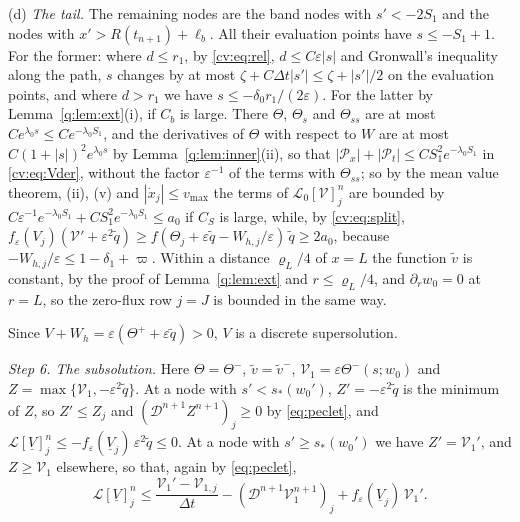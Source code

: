 \documentclass[11pt]{amsart}
\theoremstyle{definition}
\theoremstyle{remark}
\newcommand{\ve}{\varepsilon}
\newcommand{\Lop}{\mathcal{L}}
\begin{document}
\smallskip
(d) \emph{The tail.} The remaining nodes are the band nodes with $s'<-2S_1$ and the
nodes with $x'>R(t_{n+1})+\ell_b$. All their evaluation points have $s\le-S_1+1$. For the
former: where $d\le r_1$, by \eqref{cv:eq:rel}, $d\le C\ve|s|$ and Gronwall's inequality
along the path, $s$ changes by at most
$\zeta+C\Delta t|s'|\le\zeta+|s'|/2$ on the evaluation points, and where $d>r_1$ we have
$s\le-\delta_0r_1/(2\ve)$. For the latter by Lemma~\ref{q:lem:ext}(i), if $C_b$ is large. There
$\Theta$, $\Theta_s$ and $\Theta_{ss}$ are at most $Ce^{\lambda_0s}\le Ce^{-\lambda_0S_1}$, and the derivatives of $\Theta$ with
respect to $W$ are at most $C(1+|s|)^2e^{\lambda_0s}$ by Lemma~\ref{q:lem:inner}(ii), so that
$|\mathcal P_x|+|\mathcal P_t|\le CS_1^2e^{-\lambda_0S_1}$ in \eqref{cv:eq:Vder}, without the factor $\ve^{-1}$ of
the terms with $\Theta_{ss}$; so by the mean
value theorem, (ii), (v) and
$|\dot x_j|\le v_{\max}$ the terms of $\Lop_0[\mathcal V]^n_j$ are bounded by
$C\ve^{-1}e^{-\lambda_0S_1}+CS_1^2e^{-\lambda_0S_1}\le a_0$ if $C_S$ is large, while, by \eqref{cv:eq:split},
$f_\ve(V_j)(\mathcal V'+\ve^2\tilde q)\ge f(\Theta_j+\ve\tilde q-W_{h,j}/\ve)\,\tilde q\ge2a_0$, because
$-W_{h,j}/\ve\le1-\delta_1+\varpi$. Within a distance
$\varrho_L/4$ of $x=L$ the function $\tilde v$ is constant, by the proof of Lemma~\ref{q:lem:ext}
and $r\le\varrho_L/4$, and $\partial_rw_0=0$ at $r=L$, so the zero-flux row $j=J$ is bounded in the
same way.

\smallskip
Since $V+W_h=\ve(\Theta^++\ve\tilde q)>0$, $V$ is a discrete supersolution.

\emph{Step 6. The subsolution.} Here $\Theta=\Theta^-$, $\tilde v=\tilde v^-$, $\mathcal V_1=\ve\Theta^-(s;w_0)$ and
$Z=\max\{\mathcal V_1,-\ve^2\tilde q\}$. At a node with $s'<s_*(w_0')$,
$Z'=-\ve^2\tilde q$ is the minimum of $Z$, so $Z'\le Z_j$ and
$(\mathcal D^{n+1}Z^{n+1})_j\ge0$ by \eqref{eq:peclet}, and
$\Lop[\underline V]^n_j\le-f_\ve(\underline V_j)\,\ve^2\tilde q\le0$. At a node with $s'\ge s_*(w_0')$ we have
$Z'=\mathcal V_1'$, and $Z\ge\mathcal V_1$ elsewhere, so that, again by \eqref{eq:peclet},
\begin{equation}\label{cv:eq:sub1}
\Lop[\underline V]^n_j\le\frac{\mathcal V_1'-\mathcal V_{1,j}}{\Delta t}-(\mathcal D^{n+1}\mathcal V_1^{n+1})_j
+f_\ve(\underline V_j)\,\mathcal V_1'.
\end{equation}
\end{document}
